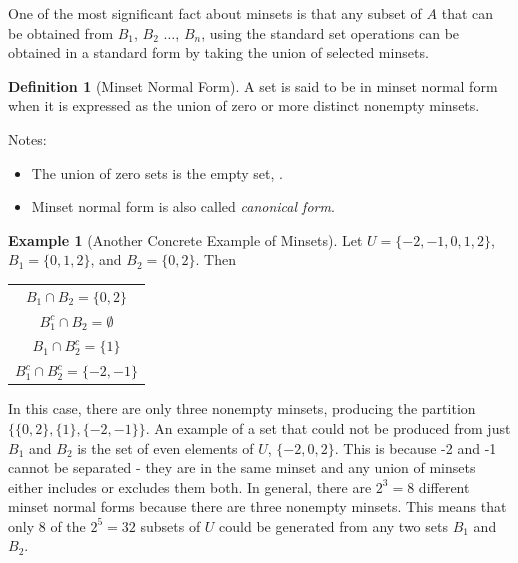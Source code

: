 \documentclass[10pt,]{book}
\theoremstyle{plain}
\theoremstyle{definition}
\newtheorem{definition}[theorem]{Definition}
\theoremstyle{definition}
\newtheorem{example}[theorem]{Example}
\theoremstyle{definition}
\begin{document}
One of the most significant fact about minsets is that any subset of \(A\) that can be obtained
from  \(B_1\), \(B_2\) \(\ldots\), \(B_n\), using the standard set operations can be obtained in a standard form by taking the union of selected minsets.%
\begin{definition}[Minset Normal Form]\label{def-minset-normal-form}
A set is said to be in minset normal 
form when it is expressed as the union of zero or more distinct nonempty minsets.%
\end{definition}
\par
Notes:%
\par
\leavevmode%
\begin{itemize}[label=\textbullet]
\item{} The union of zero sets is the empty set, \emptyset .%
\item{} Minset normal form is also called \emph{canonical form}.%
\end{itemize}
%
\begin{example}[Another Concrete Example of Minsets]\label{ex-concrete-minsets-2}
 Let \(U = \{-2,-1,0,1,2\}\), \(B_1= \{0,1,2\}\), and \(B_2= \{0,2\}\).  Then%
\leavevmode%
\begin{table}
\centering
\begin{tabular}{c}
\(B_1\cap B_2=\{0,2\}\) \tabularnewline[0pt]
\(B_1^c\cap B_2 = \emptyset\) \tabularnewline[0pt]
\(B_1\cap B_2^c = \{1\}\) \tabularnewline[0pt]
\(B_1^c\cap B_2^c = \{-2,-1\}\) 
\end{tabular}
\end{table}
\par
In this case, there are only three nonempty minsets, producing the partition \(\{\{0,2\},\{1\},\{-2,-1\}\}\). An example of a set that could not be produced from just \(B_1\) and \(B_2\) is the set of even elements of \(U\), \(\{-2,0,2\}\). This is because -2 and -1 cannot be separated - they are in the same minset and any union of minsets either includes or excludes them both.  In general, there are \(2^3= 8\) different minset normal forms because there are three nonempty minsets. This means that only 8 of the \(2^5=32\) subsets of \(U\) could be generated from  any two sets \(B_1\) and \(B_2\). %
\end{example}
\typeout{************************************************}
\typeout{************************************************}
\end{document}
